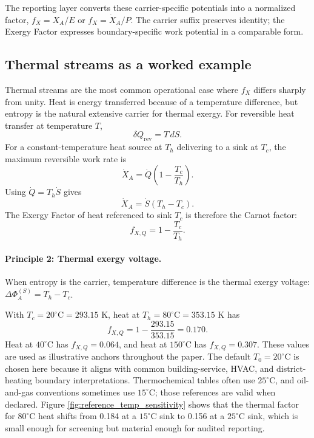 \documentclass[11pt]{article}
\newcommand{\fx}{f_X}
\newcommand{\XA}{X_A}
\newcommand{\XdotA}{\dot{X}_A}
\newcommand{\degC}{^{\circ}\mathrm{C}}
\begin{document}
The reporting layer converts these carrier-specific potentials into a normalized factor, $\fx=\XA/E$ or $\fx=\XdotA/P$. The carrier suffix preserves identity; the Exergy Factor expresses boundary-specific work potential in a comparable form.

\subsection{Thermal streams as a worked example}

Thermal streams are the most common operational case where $\fx$ differs sharply from unity. Heat is energy transferred because of a temperature difference, but entropy is the natural extensive carrier for thermal exergy. For reversible heat transfer at temperature $T$,
\begin{equation}
\delta Q_{\mathrm{rev}} = T\,dS.
\end{equation}
For a constant-temperature heat source at $T_h$ delivering to a sink at $T_c$, the maximum reversible work rate is
\begin{equation}
\XdotA = \dot{Q}\left(1-\frac{T_c}{T_h}\right).
\end{equation}
Using $\dot{Q}=T_h\dot{S}$ gives
\begin{equation}
\XdotA=\dot{S}(T_h-T_c).
\end{equation}
The Exergy Factor of heat referenced to sink $T_c$ is therefore the Carnot factor:
\begin{equation}
f_{X,Q}=1-\frac{T_c}{T_h}.
\end{equation}

\paragraph{Principle 2: Thermal exergy voltage.} When entropy is the carrier, temperature difference is the thermal exergy voltage: $\Delta\Phi_A^{(S)}=T_h-T_c$.

With $T_c=20\degC=293.15$ K, heat at $T_h=80\degC=353.15$ K has
\begin{equation}
f_{X,Q}=1-\frac{293.15}{353.15}=0.170.
\end{equation}
Heat at $40\degC$ has $f_{X,Q}=0.064$, and heat at $150\degC$ has $f_{X,Q}=0.307$. These values are used as illustrative anchors throughout the paper. The default $T_0=20\degC$ is chosen here because it aligns with common building-service, HVAC, and district-heating boundary interpretations. Thermochemical tables often use $25\degC$, and oil-and-gas conventions sometimes use $15\degC$; those references are valid when declared. Figure \ref{fig:reference_temp_sensitivity} shows that the thermal factor for $80\degC$ heat shifts from 0.184 at a $15\degC$ sink to 0.156 at a $25\degC$ sink, which is small enough for screening but material enough for audited reporting.
\end{document}
